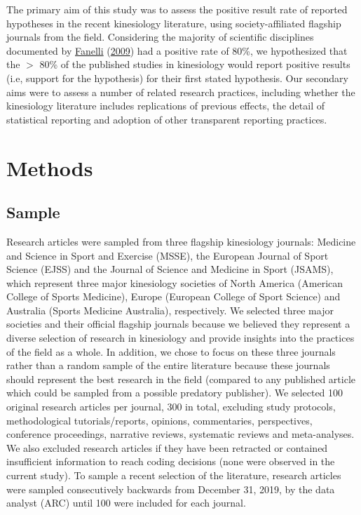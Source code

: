 \documentclass[]{cik}%
\begin{document}
The primary aim of this study was to assess the positive result rate of
reported hypotheses in the recent kinesiology literature, using
society-affiliated flagship journals from the field. Considering the
majority of scientific disciplines documented by
\protect\hyperlink{ref-fanelli_how_2009}{Fanelli}
(\protect\hyperlink{ref-fanelli_how_2009}{2009}) had a positive rate of
80\%, we hypothesized that the \(>\) 80\% of the published studies in
kinesiology would report positive results (i.e, support for the
hypothesis) for their first stated hypothesis. Our secondary aims were
to assess a number of related research practices, including whether the
kinesiology literature includes replications of previous effects, the
detail of statistical reporting and adoption of other transparent
reporting practices.

\hypertarget{methods}{%
\section{Methods}\label{methods}}

\hypertarget{sample}{%
\subsection{Sample}\label{sample}}

Research articles were sampled from three flagship kinesiology journals:
Medicine and Science in Sport and Exercise (MSSE), the European Journal
of Sport Science (EJSS) and the Journal of Science and Medicine in Sport
(JSAMS), which represent three major kinesiology societies of North
America (American College of Sports Medicine), Europe (European College
of Sport Science) and Australia (Sports Medicine Australia),
respectively. We selected three major societies and their official
flagship journals because we believed they represent a diverse selection
of research in kinesiology and provide insights into the practices of
the field as a whole. In addition, we chose to focus on these three
journals rather than a random sample of the entire literature because
these journals should represent the best research in the field (compared
to any published article which could be sampled from a possible
predatory publisher). We selected 100 original research articles per
journal, 300 in total, excluding study protocols, methodological
tutorials/reports, opinions, commentaries, perspectives, conference
proceedings, narrative reviews, systematic reviews and meta-analyses. We
also excluded research articles if they have been retracted or contained
insufficient information to reach coding decisions (none were observed
in the current study). To sample a recent selection of the literature,
research articles were sampled consecutively backwards from December 31,
2019, by the data analyst (ARC) until 100 were included for each
journal.
\end{document}
